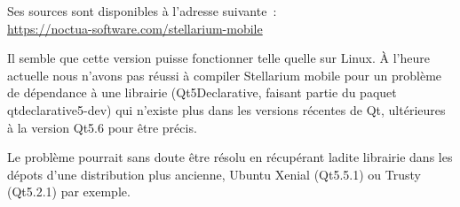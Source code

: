 Ses sources sont disponibles à l'adresse suivante~:\\\url{https://noctua-software.com/stellarium-mobile}

\vspace{1cm}

Il semble que cette version puisse fonctionner telle quelle sur Linux. À l'heure actuelle nous n'avons pas réussi à compiler Stellarium mobile pour un problème de dépendance à une librairie (Qt5Declarative, faisant partie du paquet qtdeclarative5-dev) qui n'existe plus dans les versions récentes de Qt, ultérieures à la version Qt5.6 pour être précis.

Le problème pourrait sans doute être résolu en récupérant ladite librairie dans les dépots d'une distribution plus ancienne, Ubuntu Xenial (Qt5.5.1) ou Trusty (Qt5.2.1) par exemple.

